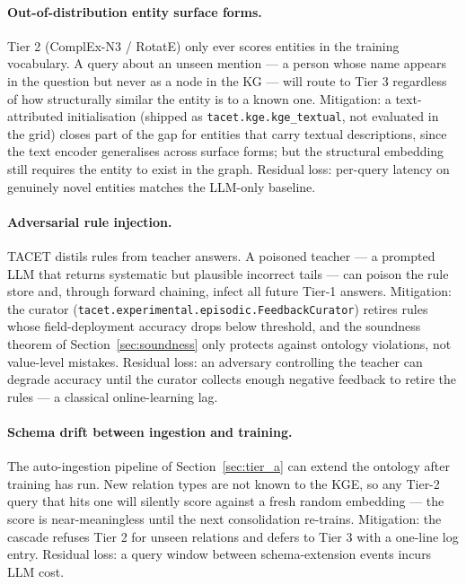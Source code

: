 \documentclass[11pt]{article}
\theoremstyle{plain}
\begin{document}
\paragraph{Out-of-distribution entity surface forms.}
Tier 2 (ComplEx-N3 / RotatE) only ever scores entities in the
training vocabulary.  A query about an unseen mention --- a person
whose name appears in the question but never as a node in the KG ---
will route to Tier 3 regardless of how structurally similar the
entity is to a known one.  Mitigation: a text-attributed initialisation
(shipped as \texttt{tacet.kge.kge\_textual}, not evaluated in the grid)
closes part of the gap for entities that carry textual descriptions, since
the text encoder generalises across surface forms; but the structural
embedding still requires the entity
to exist in the graph.  Residual loss: per-query latency on
genuinely novel entities matches the LLM-only baseline.

\paragraph{Adversarial rule injection.}
TACET distils rules from teacher answers.  A poisoned teacher --- a
prompted LLM that returns systematic but plausible incorrect tails
--- can poison the rule store and, through forward chaining, infect
all future Tier-1 answers.  Mitigation: the curator
(\texttt{tacet.experimental.episodic.FeedbackCurator}) retires rules whose
field-deployment accuracy drops below threshold, and the soundness
theorem of Section~\ref{sec:soundness} only protects against
ontology violations, not value-level mistakes.  Residual loss: an
adversary controlling the teacher can degrade accuracy until the
curator collects enough negative feedback to retire the rules --- a
classical online-learning lag.

\paragraph{Schema drift between ingestion and training.}
The auto-ingestion pipeline of Section~\ref{sec:tier_a} can extend
the ontology after training has run.  New relation types are not
known to the KGE, so any Tier-2 query that hits one will silently
score against a fresh random embedding --- the score is
near-meaningless until the next consolidation re-trains.  Mitigation:
the cascade refuses Tier 2 for unseen relations and defers to
Tier 3 with a one-line log entry.  Residual loss: a query window
between schema-extension events incurs LLM cost.
\end{document}
